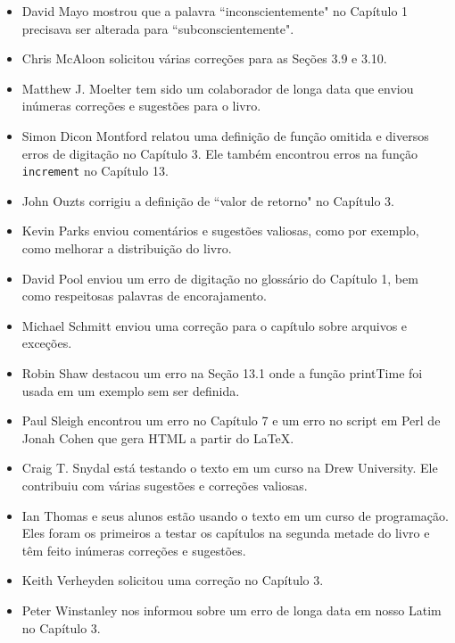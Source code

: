 \documentclass[10pt]{book}
\begin{document}
\begin {itemize}
\item David Mayo mostrou que a palavra ``inconscientemente"
no Capítulo 1 precisava
ser alterada para ``subconscientemente".

\item Chris McAloon solicitou várias correções para as Seções 3.9 e
3.10.

\item Matthew J. Moelter tem sido um colaborador de longa data que enviou
inúmeras correções e sugestões para o livro.  

\item Simon Dicon Montford relatou uma definição de função omitida e
diversos erros de digitação no Capítulo 3. Ele também encontrou erros na
função {\tt increment} no Capítulo 13.

\item John Ouzts corrigiu a definição de ``valor de retorno"
no Capítulo 3.

\item Kevin Parks enviou comentários e sugestões valiosas, como
por exemplo, como melhorar a distribuição do livro.

\item David Pool enviou um erro de digitação no glossário do Capítulo 1, bem como
respeitosas palavras de encorajamento.

\item Michael Schmitt enviou uma correção para o capítulo sobre arquivos
e exceções.

\item Robin Shaw destacou um erro na Seção 13.1 onde a
função printTime foi usada em um exemplo sem ser definida.

\item Paul Sleigh encontrou um erro no Capítulo 7 e um erro
no script em Perl de Jonah Cohen que gera HTML a partir do \LaTeX.

\item Craig T. Snydal está testando o texto em um curso na Drew
University. Ele contribuiu com várias sugestões e correções valiosas.

\item Ian Thomas e seus alunos estão usando o texto em um curso de
programação. Eles foram os primeiros a testar os capítulos na segunda metade
do livro e têm feito inúmeras correções e sugestões.

\item Keith Verheyden solicitou uma correção no Capítulo 3.

\item Peter Winstanley nos informou sobre um erro de longa data em
nosso Latim no Capítulo 3.


\end{itemize}
\end{document}
